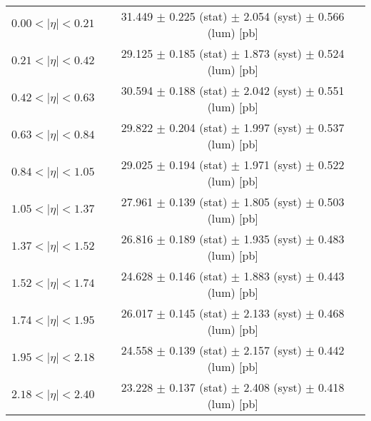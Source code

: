 \begin{tabular}{lc}
\hline
$0.00 < |\eta| <0.21$          & 31.449 $\pm$ 0.225 (stat) $\pm$ 2.054 (syst) $\pm$ 0.566 (lum) [pb]  \\
$0.21 < |\eta| <0.42$          & 29.125 $\pm$ 0.185 (stat) $\pm$ 1.873 (syst) $\pm$ 0.524 (lum) [pb]  \\
$0.42 < |\eta| <0.63$          & 30.594 $\pm$ 0.188 (stat) $\pm$ 2.042 (syst) $\pm$ 0.551 (lum) [pb]  \\
$0.63 < |\eta| <0.84$          & 29.822 $\pm$ 0.204 (stat) $\pm$ 1.997 (syst) $\pm$ 0.537 (lum) [pb]  \\
$0.84 < |\eta| <1.05$          & 29.025 $\pm$ 0.194 (stat) $\pm$ 1.971 (syst) $\pm$ 0.522 (lum) [pb]  \\
$1.05 < |\eta| <1.37$          & 27.961 $\pm$ 0.139 (stat) $\pm$ 1.805 (syst) $\pm$ 0.503 (lum) [pb]  \\
$1.37 < |\eta| <1.52$          & 26.816 $\pm$ 0.189 (stat) $\pm$ 1.935 (syst) $\pm$ 0.483 (lum) [pb]  \\
$1.52 < |\eta| <1.74$          & 24.628 $\pm$ 0.146 (stat) $\pm$ 1.883 (syst) $\pm$ 0.443 (lum) [pb]  \\
$1.74 < |\eta| <1.95$          & 26.017 $\pm$ 0.145 (stat) $\pm$ 2.133 (syst) $\pm$ 0.468 (lum) [pb]  \\
$1.95 < |\eta| <2.18$          & 24.558 $\pm$ 0.139 (stat) $\pm$ 2.157 (syst) $\pm$ 0.442 (lum) [pb]  \\
$2.18 < |\eta| <2.40$          & 23.228 $\pm$ 0.137 (stat) $\pm$ 2.408 (syst) $\pm$ 0.418 (lum) [pb]  \\
\hline
\end{tabular}
